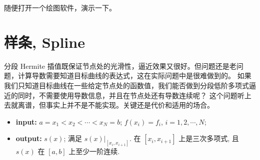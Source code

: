 \documentclass[a4paper]{ctexart}
\begin{document}
{随便打开一个绘图软件，演示一下。



\section{样条, Spline}

分段 Hermite 插值既保证节点处的光滑性，逼近效果又很好。但问题还是老问题，计算导数需要知道目标曲线的表达式，这在实际问题中是很难做到的。
如果我们只知道目标曲线在一些给定节点处的函数值，我们能否做到分段低阶多项式逼近的同时，不需要使用导数信息，并且在节点处还有导数连续呢？
这个问题听上去就离谱，但事实上并不是不能实现。关键还是代价和适用的场合。

\begin{itemize}
  \item {\bf input: } \newline 
  $a = x_1 < x_2 < \cdots < x_N = b$; \newline
  $f(x_i) = f_i$, $i = 1, 2, \cdots, N$;
  \item {\bf output: } \newline
  $s(x)$; 满足 $\left.s(x) \right|_{[x_i, x_{i + 1}]}. 
  $ 在 $[x_i, x_{i + 1}]$ 上是三次多项式, 且 \newline
  $s(x)$ 在 $[a, b]$ 上至少一阶连续.
\end{itemize}

}
\end{document}
